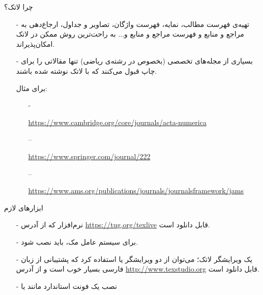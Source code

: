 \begin{frame}{چرا لاتک؟}
\begin{itemize}\itemr
\item[-]
تهیه‌ی فهرست مطالب، نمایه، فهرست واژگان، تصاویر و جداول، ارجاع‌دهی به مراجع و منابع و فهرست مراجع و منابع و... به راحت‌ترین روش ممکن در لاتک امکان‌پذیراند.

\item[-]
بسیاری از مجله‌های تخصصی (بخصوص در رشته‌ی ریاضی) تنها مقالاتی را برای چاپ قبول می‌کنند که با لاتک نوشته شده باشند.

برای مثال:
\begin{itemize}\itemr
\item[-]

\begin{flushleft}
\url{https://www.cambridge.org/core/journals/acta-numerica}
\end{flushleft}

\item[--]

\begin{flushleft}
\url{https://www.springer.com/journal/222}
\end{flushleft}

\item[--]

\begin{flushleft}
\url{https://www.ams.org/publications/journals/journalsframework/jams}
\end{flushleft}
\end{itemize}
\end{itemize}
\end{frame}

\begin{frame}{ابزار‌های لازم}
\begin{itemize}\itemr
\item[-]
نرم‌افزار 
که از آدرس
\url{https://tug.org/texlive}
قابل دانلود است.

\item[-]
برای سیستم عامل مک، باید 
نصب شود.

\item[-]
یک ویرایشگر لاتک؛ می‌توان از دو ویرایشگر 
یا 
استفاده کرد که پشتیبانی 
از زبان‌ فارسی بسیار خوب است و از آدرس
\url{http://www.texstudio.org}
قابل دانلود است.

\item[-]
نصب یک فونت استاندارد مانند 
یا 

\end{itemize}
\end{frame}